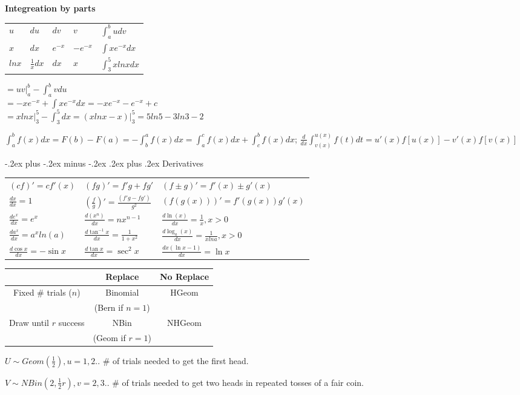 \documentclass[10pt,landscape]{article}
\makeatletter
\renewcommand{\subsubsection}{\@startsection{subsubsection}{3}{0mm}%
                                {-.2ex plus -.2ex minus -.2ex}%
                                {.2ex plus .2ex}%
                                {\normalfont\small\bfseries}}
\makeatother
\begin{document}
\begin{multicols}{1}
\textbf{Integreation by parts}
\begin{tabular}{ l|l|l|l|l }
$u$ & $du$ & $dv$     & $v$        & $\int_a^b{u}dv$ \\
$x$ & $dx$ & $e^{-x}$ & $-e^{-x}$  & $\int{x}e^{-x}dx$ \\ 
$lnx$ & $\frac1x{dx}$ & $dx$ & $x$ & $\int_3^5{x}lnxdx$ 
\end{tabular}

$=\left.uv\right|_a^b-\int_a^b{v}du $ \\
$=-xe^{-x}+\int{x}e^{-x}dx=-xe^{-x}-e^{-x}+c $ \\
$=\left.xlnx\right|_3^5-\int_3^5dx=\left.(xlnx-x)\right|_3^5=5ln5-3ln3-2 $

$\int_a^b{f(x)}dx=F(b)-F(a)=-\int_b^a{f(x)}dx=\int_a^c{f(x)}dx+\int_c^b{f(x)}dx$;
$\frac{d}{dx}\int_{v(x)}^{u(x)}{f(t)}dt=u'(x)f[u(x)]-v'(x)f[v(x)]$ 

  \subsubsection{Derivatives}
\begin{tabular}{ l|l|l }
$(cf)'=cf'(x)$               & $(fg)'=f'g+fg'$                      & $(f\pm g)'=f'(x)\pm g'(x)$ \\
$\frac{dx}{dx}=1$            & $(\frac{f}g)'=\frac{(f'g-fg')}{g^2}$ & $(f(g(x)))'=f'(g(x))g'(x)$ \\
$\frac{de^x}{dx}=e^x$        & $\frac{d(x^n)}{dx}=nx^{n-1}$         & $\frac{d\ln(x)}{dx}=\frac1x,x>0$ \\
$\frac{da^x}{dx}=a^xln(a)$   & $\frac{d\tan^{-1}x}{dx}=\frac1{1+x^2}$  & $\frac{d\log_a(x)}{dx}=\frac1{xlna},x>0$ \\
$\frac{d\cos{x}}{dx}=-\sin{x}$& $\frac{d\tan{x}}{dx}=\sec^2{x}$  & $\frac{dx(\ln{x}-1)}{dx}=\ln{x}$ 
\end{tabular} 

\begin{tabular}{ccc}
~ & Replace & No Replace  \\ \midrule
Fixed \# trials ($n$) & Binomial & HGeom \\ 
~ & (Bern if $n = 1$) & ~ \\ 
Draw until $r$ success & NBin & NHGeom \\ 
~ & (Geom if $r = 1$) & ~\\ \bottomrule
\end{tabular}

$U\sim Geom(\frac12),u=1,2..$ \# of trials needed to get the first head.

$V\sim NBin(2,\frac12r),v=2,3..$ \# of trials needed to get two heads in repeated tosses of a fair coin.

\end{multicols}
\end{document}
